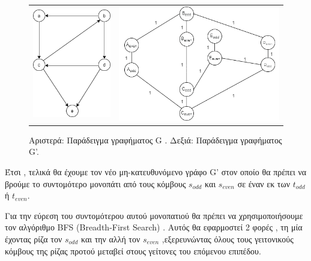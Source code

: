\documentclass[12pt,a4paper]{article}
\begin{document}
\begin{figure}[h]
    \begin{tabular}{ll}
    \includegraphics[scale=0.7]{images/dag_for_1.png}
    &
    \includegraphics[scale=0.8]{images/nondag_for_1 (1).png}
    \end{tabular}
    \caption{Αριστερά: Παράδειγμα γραφήματος G . Δεξιά: Παράδειγμα γραφήματος G'.}
\end{figure}



Έτσι , τελικά θα έχουμε τον νέο μη-κατευθυνόμενο γράφο G' στον οποίο θα πρέπει να βρούμε το συντομότερο μονοπάτι από τους κόμβους $s_{odd}$ και $s_{even}$ σε έναν εκ των $t_{odd}$ ή $t_{even}$.


\par 
Για την εύρεση του συντομότερου αυτού μονοπατιού θα πρέπει να χρησιμοποιήσουμε τον αλγόριθμο BFS (Breadth-First Search) . Αυτός θα εφαρμοστεί 2 φορές , τη μία έχοντας ρίζα τον $s_{odd}$ και την αλλή τον $s_{even}$ ,εξερευνώντας όλους τους γειτονικούς κόμβους της ρίζας προτού μεταβεί στους γείτονες του επόμενου επιπέδου. 
\end{document}
